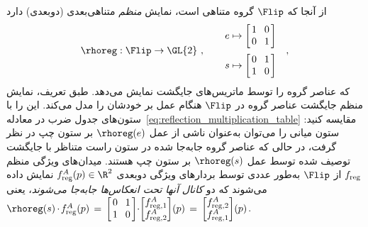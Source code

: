 از آنجا که $\Flip$ گروه متناهی است، نمایش \emph{منظم} متناهی‌بعدی (دوبعدی) دارد
\begin{align}
	\rhoreg: \Flip \to \GL{2}\ , \qquad 
	\begin{aligned}
		e &\mapsto
		\begin{bmatrix} \hspace{1.5pt}
			1 &\mkern-4mu 0 \hspace*{1.5pt} \\ \hspace{1.5pt} 0 &\mkern-4mu 1 \hspace*{1.5pt}
		\end{bmatrix} \\[2pt]
		s &\mapsto 
		\begin{bmatrix} \hspace{1.5pt}
			0 &\mkern-4mu 1 \hspace*{1.5pt} \\ \hspace{1.5pt} 1 &\mkern-4mu 0 \hspace*{1.5pt}
		\end{bmatrix}
	\end{aligned}
	\quad ,
\end{align}
که عناصر گروه را توسط ماتریس‌های جایگشت نمایش می‌دهد.
طبق تعریف، نمایش منظم جایگشت عناصر گروه در $\Flip$ هنگام عمل بر خودشان را مدل می‌کند.
این را با ستون‌های جدول ضرب در معادله~\eqref{eq:reflection_multiplication_table} مقایسه کنید:
ستون میانی را می‌توان به‌عنوان ناشی از عمل $\rhoreg(e)$ بر ستون چپ در نظر گرفت، در حالی که عناصر گروه جابه‌جا شده در ستون راست متناظر با جایگشت توصیف شده توسط عمل $\rhoreg(s)$ بر ستون چپ هستند.
میدان‌های ویژگی منظم $f_{\textup{reg}}$ از $\Flip$ به‌طور عددی توسط بردارهای ویژگی دوبعدی $f^A_{\textup{reg}}(p) \in \R^2$ نمایش داده می‌شوند که دو \emph{کانال آنها تحت انعکاس‌ها جابه‌جا می‌شوند}، یعنی
$
\rhoreg(s) \mkern-1mu\cdot\mkern-2mu f^A_{\textup{reg}}(p)
\,=\,
\begin{bmatrix} \hspace{1.5pt} 0 &\mkern-4mu 1 \hspace*{1.5pt} \\ \hspace{1.5pt} 1 &\mkern-4mu 0 \hspace*{1.5pt} \end{bmatrix}
\mkern-4mu \cdot\mkern-4mu 
\begin{bmatrix} f^A_{\textup{reg},1} \\ f^A_{\textup{reg},2} \end{bmatrix} \!(p)
\,=\,
\begin{bmatrix} f^A_{\textup{reg},2} \\ f^A_{\textup{reg},1} \end{bmatrix} \!(p)
$.

